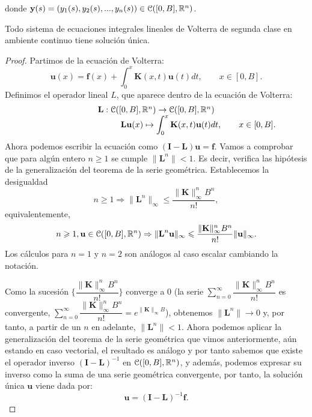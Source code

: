 donde $\textbf{y}(s) = (y_1(s),y_2(s),...,y_n(s)) \in \mathcal{C}([0,B],\mathbb{R}^n)$.
\begin{corolario}
	Todo sistema de ecuaciones integrales lineales de Volterra de segunda clase en ambiente continuo tiene solución única.
\end{corolario}
\begin{proof}
	Partimos de la ecuación de Volterra:
	\begin{equation}
		\textbf{u}(x) = \textbf{f}(x) + \int_0^x \textbf{K}(x,t)\textbf{u}(t)dt, \qquad x \in [0,B].
	\end{equation}
	Definimos el operador lineal $L$, que aparece dentro de la ecuación de Volterra:
	\begin{equation}
		\begin{array}{c}
			\textbf{L}: \mathcal{C}([0,B],\mathbb{R}^n) \rightarrow \mathcal{C}([0,B],\mathbb{R}^n) \\
			\qquad \qquad \qquad \qquad \qquad \textbf{L}\textbf{u}(x) \mapsto \displaystyle \int_{0}^{x} \textbf{K}(x,t)\textbf{u}(t)dt, \qquad x \in [0,B].
		\end{array}
	\end{equation}
	Ahora podemos escribir la ecuación como $(\textbf{I}-\textbf{L})\textbf{u} = \textbf{f}$.
	Vamos a comprobar que para algún entero $n \geqslant 1$ se cumple $\lVert \textbf{L}^n \rVert < 1$. Es decir, verifica las hipótesis de la generalización del teorema de la serie geométrica. Establecemos la desigualdad
	\begin{equation}
		n \geqslant 1 \Rightarrow \lVert \textbf{L}^n \rVert_\infty \leqslant \dfrac{\lVert \textbf{K} \rVert_\infty^nB^n}{n!},
	\end{equation}
	equivalentemente,
	\begin{equation}\label{eq:ref2}
		n \geqslant 1, \textbf{u} \in \mathcal{C}([0,B],\mathbb{R}^n) \Rightarrow \lVert \textbf{L}^n\textbf{u} \rVert_\infty \leqslant \dfrac{\lVert \textbf{K} \rVert_\infty^nB^n}{n!}\lVert \textbf{u} \rVert_\infty.
	\end{equation}
	Los cálculos para $n = 1$ y $n = 2$ son análogos al caso escalar cambiando la notación.
	
	\noindent Como la sucesión $\{\dfrac{\lVert \textbf{K} \rVert_\infty^nB^n}{n!}\}$ converge a $0$ (la serie $\displaystyle \sum_{n=0}^{\infty}\dfrac{\lVert \textbf{K} \rVert_\infty^nB^n}{n!}$ es convergente, $\displaystyle \sum_{n=0}^{\infty}\dfrac{\lVert \textbf{K} \rVert_\infty^nB^n}{n!} = e^{\lVert \textbf{K} \rVert_\infty B}$), obtenemos $\lVert \textbf{L}^n \rVert \rightarrow 0$ y, por tanto, a partir de un $n$ en adelante, $\lVert \textbf{L}^n \rVert < 1$.
	Ahora podemos aplicar la generalización del teorema de la serie geométrica que vimos anteriormente, aún estando en caso vectorial, el resultado es análogo y por tanto sabemos que existe el operador inverso $(\textbf{I}-\textbf{L})^{-1}$ en $\mathcal{C}([0,B],\mathbb{R}^n)$, y además, podemos expresar su inverso como la suma de una serie geométrica convergente, por tanto, la solución única $\textbf{u}$ viene dada por:
	\begin{equation}
		\textbf{u} = (\textbf{I}-\textbf{L})^{-1}\textbf{f}.
	\end{equation}
\end{proof}
